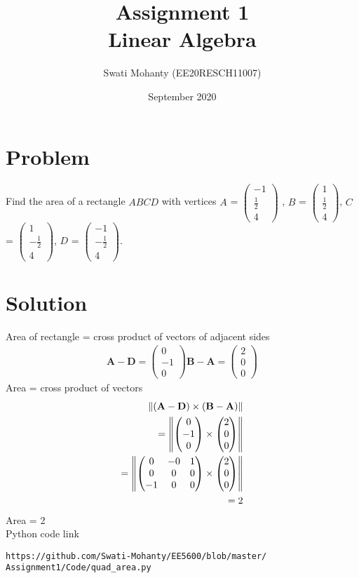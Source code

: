 \documentclass[journal,12pt,twocolumn]{IEEEtran}
\title{Assignment 1
\\Linear Algebra }
\author{Swati Mohanty (EE20RESCH11007) }
\date{September 2020}
\newcommand{\myvec}[1]{\ensuremath{\begin{pmatrix}#1\end{pmatrix}}}
\let\vec\mathbf
\begin{document}
\maketitle


\section{Problem}
Find the area of a rectangle $ABCD$ with vertices $A$ = \myvec{-1 \\\frac{1}{2} \\4} , $B$ = \myvec{1 \\\frac{1}{2} \\4}, $C$ = \myvec{1 \\-\frac{1}{2} \\4}, $D$ = \myvec{-1 \\-\frac{1}{2} \\4}.
\section{Solution}
Area of rectangle = cross product of vectors of adjacent sides
\begin{align}
    \vec{A} - \vec{D} = \myvec{0 \\-1 \\0} 
    \vec{B} -\vec{A} = \myvec{2 \\0 \\0}
\end{align}   
Area = cross product of vectors
\begin{align}
    \norm{(\vec{A}-\vec{D}) \times  (\vec{B}-\vec{A})}   
    \\=\norm{\myvec{0 \\-1 \\0}  \times \myvec{2 \\0 \\0}} 
    \\=\norm{\myvec{0&-0&1 \\0&0&0 \\-1&0&0} \times \myvec{2 \\0 \\0}}
    \\= 2
\end{align}
Area = 2 
\\Python code link 
\begin{lstlisting}
https://github.com/Swati-Mohanty/EE5600/blob/master/
Assignment1/Code/quad_area.py
\end{lstlisting}
\end{document}
